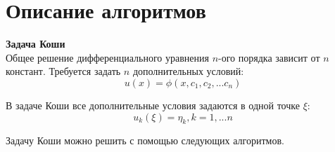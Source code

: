 \section*{Описание алгоритмов}
\textbf{Задача Коши}\\

Общее решение дифференциального уравнения $n$-ого порядка зависит от $n$ констант. Требуется задать $n$ дополнительных условий:
\begin{equation}\label{formula2}
	u(x) = \phi(x, c_1, c_2, ... c_n)
\end{equation}

В задаче Коши все дополнительные условия задаются в одной точке $\xi$:
\begin{equation}\label{formula3}
	u_k(\xi) = \eta_k, k = 1,...n
\end{equation}

Задачу Коши можно решить с помощью следующих алгоритмов. \\
